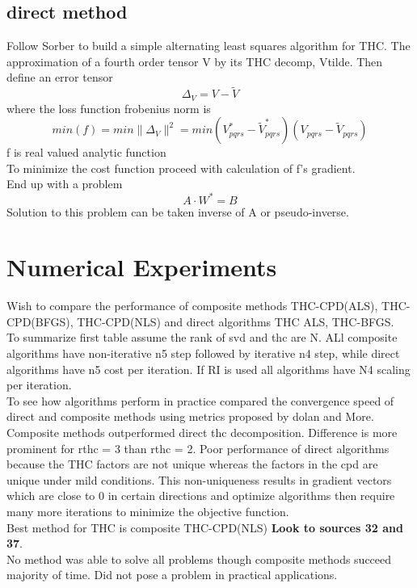 \documentclass[10pt, draft]{article}
\begin{document}
\subsection{direct method}

Follow Sorber to build a simple alternating least squares algorithm for THC.  The approximation of a fourth order tensor V by its THC decomp, Vtilde. Then define an error tensor 
\[\Delta_V = V- \tilde{V}\]
where the loss function frobenius norm is 
\[min (f) =min \| \Delta_V\|^2 =  min (V^*_{pqrs} - \tilde{V}^*_{pqrs}) (V_{pqrs} - \tilde{V}_{pqrs})\]
f is real valued analytic function\\
To minimize the cost function proceed with calculation of f's gradient.  \\
End up with a problem 
\[A \cdot W^* = B\]
Solution to this problem can be taken inverse of A or pseudo-inverse.  

\section{Numerical Experiments}
Wish to compare the performance of composite methods THC-CPD(ALS), THC-CPD(BFGS), THC-CPD(NLS) and direct algorithms THC ALS, THC-BFGS. \\
To summarize first table assume the rank of svd and thc are N. ALl composite algorithms have non-iterative n5 step followed by iterative n4 step, while direct algorithms have n5 cost per iteration. If RI is used all algorithms have N4 scaling per iteration.  \\
To see how algorithms perform in practice compared the convergence speed of direct and composite methods using metrics proposed by dolan and More.  \\
Composite methods outperformed direct thc decomposition. Difference is more prominent for rthc = 3 than rthc = 2.  Poor performance of direct algorithms because the THC factors are not unique whereas the factors in the cpd are unique under mild conditions.  This non-uniqueness results in gradient vectors which are close to 0 in certain directions and optimize algorithms then require many more iterations to minimize the objective function.\\
Best method for THC is composite THC-CPD(NLS)  \textbf{Look to sources 32 and 37}.\\
No method was able to solve all problems though composite methods succeed majority of time.  Did not pose a problem in practical applications.  
\end{document}
